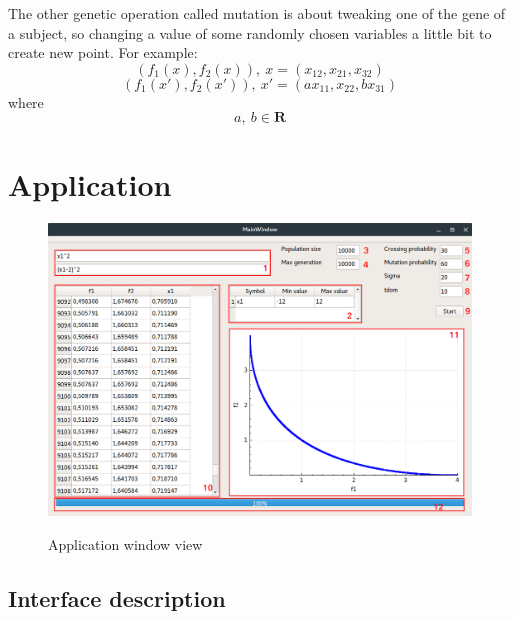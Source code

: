 \documentclass[a4paper, 11pt]{article}
\begin{document}
	The other genetic operation called mutation is about tweaking one of the gene of
	a subject, so changing a value of some randomly chosen variables a little bit to 
	create new point. For example:
	$$(f_{1}(x), f_{2}(x)),\ x=(x_{12}, x_{21}, x_{32})$$
	$$(f_{1}(x'), f_{2}(x')),\ x'=(ax_{11}, x_{22}, bx_{31})$$
	where
	$$a,\ b\in \boldsymbol{R}$$
	
	\newpage	
	\section{Application}
	
	\begin{figure}[H]
	\caption{Application window view}
	\centering
	\includegraphics[scale=0.35]{application}
	\label{fig:app_window}
	\end{figure}
	
	\subsection{Interface description}	
	
\end{document}
